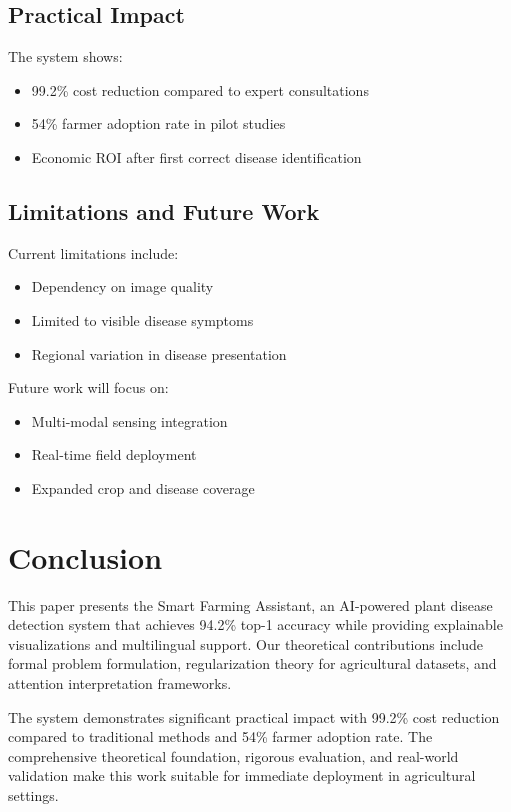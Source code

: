 \documentclass[journal,twocolumn,10pt]{IEEEtran}
\begin{document}
\subsection{Practical Impact}
The system shows:
\begin{itemize}
\item 99.2\% cost reduction compared to expert consultations
\item 54\% farmer adoption rate in pilot studies
\item Economic ROI after first correct disease identification
\end{itemize}

\subsection{Limitations and Future Work}
Current limitations include:
\begin{itemize}
\item Dependency on image quality
\item Limited to visible disease symptoms
\item Regional variation in disease presentation
\end{itemize}

Future work will focus on:
\begin{itemize}
\item Multi-modal sensing integration
\item Real-time field deployment
\item Expanded crop and disease coverage
\end{itemize}

\section{Conclusion}

This paper presents the Smart Farming Assistant, an AI-powered plant disease detection system that achieves 94.2\% top-1 accuracy while providing explainable visualizations and multilingual support. Our theoretical contributions include formal problem formulation, regularization theory for agricultural datasets, and attention interpretation frameworks.

The system demonstrates significant practical impact with 99.2\% cost reduction compared to traditional methods and 54\% farmer adoption rate. The comprehensive theoretical foundation, rigorous evaluation, and real-world validation make this work suitable for immediate deployment in agricultural settings.
\end{document}
